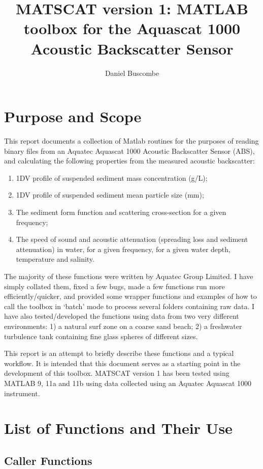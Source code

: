 \documentclass[a4paper,10pt]{report}
\title{MATSCAT version 1: MATLAB toolbox for the Aquascat 1000 Acoustic Backscatter Sensor}
\author{Daniel Buscombe}
\begin{document}
\maketitle

\section{Purpose and Scope}
This report documents a collection of Matlab routines for the purposes of reading binary files from an Aquatec Aquascat 1000 Acoustic Backscatter Sensor (ABS), and calculating the following properties from the measured acoustic backscatter:

\begin{enumerate}
 \item 1DV profile of suspended sediment mass concentration (g/L);
 \item 1DV profile of suspended sediment mean particle size (mm);
 \item The sediment form function and scattering cross-section for a given frequency;
 \item The speed of sound and acoustic attenuation (spreading loss and sediment attenuation) in water, for a given frequency, for a given water depth, temperature and salinity.
\end{enumerate}

The majority of these functions were written by Aquatec Group Limited. I have simply collated them, fixed a few bugs, made a few functions run more efficiently/quicker, and provided some wrapper functions and examples of how to call the toolbox in `batch' mode to process several folders containing raw data. I have also tested/developed the functions using data from two very different environments: 1) a natural surf zone on a coarse sand beach; 2) a freshwater turbulence tank containing fine glass spheres of different sizes. 

This report is an attempt to briefly describe these functions and a typical workflow. It is intended that this document serves as a starting point in the development of this toolbox. MATSCAT version 1 has been tested using MATLAB 9, 11a and 11b using data collected using an Aquatec Aquascat 1000 instrument.

\section{List of Functions and Their Use}

\subsection{Caller Functions}
\end{document}
